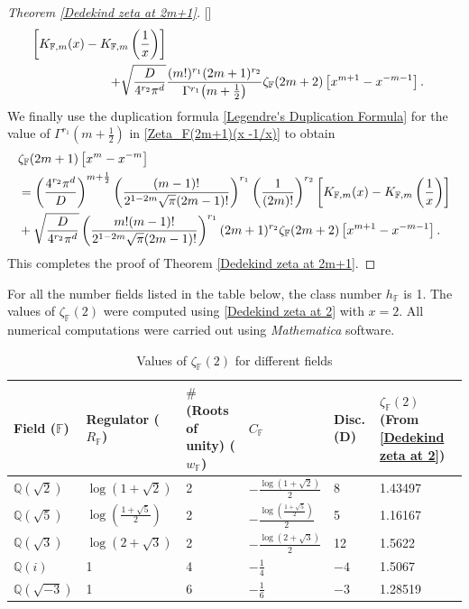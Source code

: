 \documentclass[12pt,reqno]{amsart}
\renewcommand{\(}{\left\(}
\renewcommand{\)}{\right\)}
\renewcommand{\[}{\left\[}
\renewcommand{\]}{\right\]}
\numberwithin{equation}{section}
\theoremstyle{plain}
\begin{document}
\begin{proof}[Theorem \rm{\ref{Dedekind zeta at 2m+1}}][]
\begin{align}
\left[K_{\mathbb{F}, m}(x) - K_{\mathbb{F}, m}\left(\frac{1}{x}\right)\right] \notag \\
+ \sqrt{\frac{D}{4^{r_2}\pi^d}}&\frac{(m!)^{r_1} (2m+1)^{r_2} }{ \Gamma^{r_1}\!\left(m+\frac{1}{2}\right)} \zeta_{\mathbb{F}}(2m+2) \left[x^{m+1} - x^{-m-1}\right]. \label{Zeta_F(2m+1)(x -1/x)}
\end{align}
We finally use the duplication formula \eqref{Legendre's Duplication Formula} for the value of $\Gamma^{r_1}\!\left(m+\frac{1}{2}\right)$ in \eqref{Zeta_F(2m+1)(x -1/x)} to obtain
\begin{align*}
&\zeta_{\mathbb{F}}(2m+1)\left[x^{m} - x^{-m}\right] \\
&= \left( \frac{4^{r_2} \pi^d}{D}\right)^{m+\frac{1}{2}} \left( \frac{(m-1)!}{ 2^{1-2m} \sqrt{\pi} (2m-1)!} \right)^{r_1} \left(\frac{1}{(2m)!} \right)^{r_2}\left[K_{\mathbb{F}, m}(x) - K_{\mathbb{F}, m}\left(\frac{1}{x}\right)\right] \notag \\
&+ \sqrt{\frac{D}{4^{r_2}\pi^d}} \left(\frac{m! (m-1)!}{2^{1-2m} \sqrt{\pi} (2m-1)!} \right)^{r_1} (2m+1)^{r_2} \zeta_{\mathbb{F}}(2m+2) \left[x^{m+1} - x^{-m-1}\right].
\end{align*}
This completes the proof of Theorem \ref{Dedekind zeta at 2m+1}.
\end{proof}


For all the number fields listed in the table below, the class number $h_{\mathbb{F}}$ is 1. The values of $\zeta_{\mathbb{F}}(2)$ were computed using \eqref{Dedekind zeta at 2} with $x=2$. All numerical computations were carried out using \emph{Mathematica} software.
\begin{table}[h]
\centering
\renewcommand{\arraystretch}{1.4}
\caption{Values of $\zeta_{\mathbb{F}}(2)$ for different fields} \label{Zeta_2}
\vspace{0.2cm}
\begin{tabular}{|p{1.45cm}|p{2cm}|p{1.6cm}|p{1.8cm}|p{1.2cm}|p{2cm}|}
\hline
\textbf{Field ($\mathbb{F}$)} & \textbf{Regulator} ($R_\mathbb{F}$) & $\#$\textbf{(Roots of unity)} ($w_\mathbb{F}$) & \textbf{$C_\mathbb{F}$} &\textbf{Disc.} (D) & $\zeta_{\mathbb{F}}(2)$ (From \eqref{Dedekind zeta at 2}) \\
\hline
$\mathbb{Q}(\sqrt{2})$ & $\log(1 + \sqrt{2})$ & 2 & $-\frac{\log(1+\sqrt{2})}{2}$ & 8 & 1.43497 \\
\hline
$\mathbb{Q}(\sqrt{5})$ & $\log\left(\frac{1 + \sqrt{5}}{2}\right)$ & 2 & $-\frac{\log\left(\frac{1 + \sqrt{5}}{2}\right)}{2}$ & 5 & 1.16167 \\
\hline
$\mathbb{Q}(\sqrt{3})$ & $\log(2 + \sqrt{3})$ & 2 & $-\frac{\log(2 + \sqrt{3})}{2}$ & 12 & 1.5622 \\
\hline
$\mathbb{Q}(i)$  & 1 & 4 & $-\frac{1}{4}$ & $-4$ & 1.5067 \\
\hline
$\mathbb{Q}(\sqrt{-3})$ & 1 & 6 & $-\frac{1}{6}$ & $-3$ & 1.28519 \\
\hline
\end{tabular}
\end{table}
\end{document}

